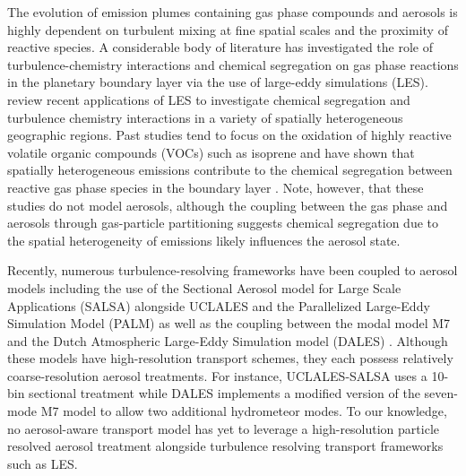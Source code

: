 \documentclass[journal abbreviation, manuscript]{copernicus}
\begin{document}
The evolution of emission plumes containing gas phase compounds and aerosols is highly dependent on turbulent mixing at fine spatial scales and the proximity of reactive species. A considerable body of literature has investigated the role of turbulence-chemistry interactions and chemical segregation on gas phase reactions in the planetary boundary layer via the use of large-eddy simulations (LES). \citet{brasseur_segregation_2023} review recent applications of LES to investigate chemical segregation and turbulence chemistry interactions in a variety of spatially heterogeneous geographic regions. Past studies tend to focus on the oxidation of highly reactive volatile organic compounds (VOCs) such as isoprene and have shown that spatially heterogeneous emissions contribute to the chemical segregation between reactive gas phase species in the boundary layer \citep{ouwersloot_segregation_2011, kaser_chemistry-turbulence_2015}. Note, however, that these studies do not model aerosols, although the coupling between the gas phase and aerosols through gas-particle partitioning suggests chemical segregation due to the spatial heterogeneity of emissions likely influences the aerosol state. 


Recently, numerous turbulence-resolving frameworks have been coupled to aerosol models including the use of the Sectional Aerosol model for Large Scale Applications (SALSA) \citep{kokkola_salsa_2008} alongside UCLALES \citep{tonttila_uclalessalsa_2017} and the Parallelized Large-Eddy Simulation Model (PALM) \citep{kurppa_implementation_2019} as well as the coupling between the modal model M7 \citep{vignati_m7_2004} and the Dutch Atmospheric Large-Eddy Simulation model (DALES) \citep{de_bruine_explicit_2019}.
Although these models have high-resolution transport schemes, they each possess relatively coarse-resolution aerosol treatments. For instance, UCLALES-SALSA uses a 10-bin sectional treatment while DALES implements a modified version of the seven-mode M7 model to allow two additional hydrometeor modes. To our knowledge, no aerosol-aware transport model has yet to leverage a high-resolution particle resolved aerosol treatment alongside turbulence resolving transport frameworks such as LES. 

\end{document}
